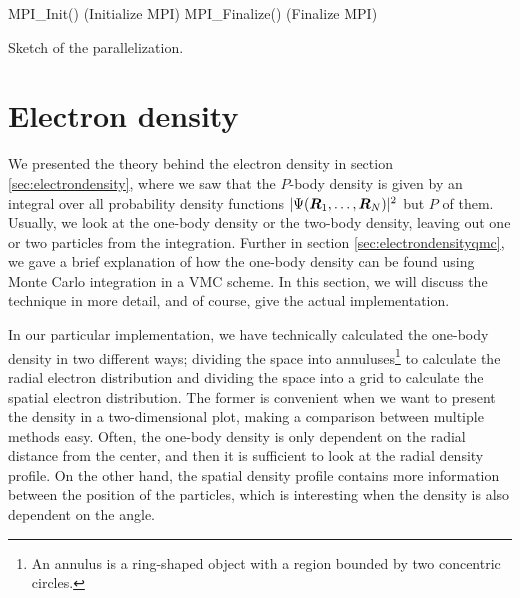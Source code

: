 \IncMargin{1em}
\begin{algorithm}[H]
	\SetAlgoLined
	MPI\_Init() (Initialize MPI)\;
	MPI\_Finalize() (Finalize MPI)\;
	\caption{Sketch of the parallelization.}
	\label{alg:mpi}
\end{algorithm}\DecMargin{1em}

\section{Electron density} \label{sec:electrondensityimplementation}
We presented the theory behind the electron density in section \ref{sec:electrondensity}, where we saw that the $P$-body density is given by an integral over all probability density functions $|\Psi(\boldsymbol{{R}}_1,\hdots,\boldsymbol{{R}}_N)|^2$ but $P$ of them. Usually, we look at the one-body density or the two-body density, leaving out one or two particles from the integration. Further in section \ref{sec:electrondensityqmc}, we gave a brief explanation of how the one-body density can be found using Monte Carlo integration in a VMC scheme. In this section, we will discuss the technique in more detail, and of course, give the actual implementation.

In our particular implementation, we have technically calculated the one-body density in two different ways; dividing the space into annuluses\footnote{An annulus is a ring-shaped object with a region bounded by two concentric circles.} to calculate the radial electron distribution and dividing the space into a grid to calculate the spatial electron distribution. The former is convenient when we want to present the density in a two-dimensional plot, making a comparison between multiple methods easy. Often, the one-body density is only dependent on the radial distance from the center, and then it is sufficient to look at the radial density profile. On the other hand, the spatial density profile contains more information between the position of the particles, which is interesting when the density is also dependent on the angle.

